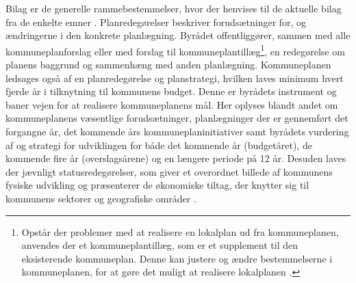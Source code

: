 \newline \indent{     }  Bilag er de generelle rammebestemmelser, hvor der henvises til de aktuelle bilag fra de enkelte emner \citep{bilag}.
\newline \indent{     }  Planredegørelser beskriver forudsætninger for, og ændringerne i den konkrete planlægning. Byrådet offentliggører, sammen med alle kommuneplanforslag eller med forslag til kommuneplantillæg\footnote{Opstår der problemer med at realisere en lokalplan ud fra kommuneplanen, anvendes der et kommuneplantillæg, som er et supplement til den eksisterende kommuneplan. Denne kan justere og ændre bestemmelserne i kommuneplanen, for at gøre det muligt at realisere lokalplanen \citep{kommuneplan2009}.}, en redegørelse om planens baggrund og sammenhæng med anden planlægning. Kommuneplanen ledsages også af en planredegørelse og planstrategi, hvilken laves minimum hvert fjerde år i tilknytning til kommunens budget. Denne er byrådets instrument og baner vejen for at realisere kommuneplanens mål. Her oplyses blandt andet om kommuneplanens væsentlige forudsætninger, planlægninger der er gennemført det forgangne år, det kommende års kommuneplaninitiativer samt byrådets vurdering af og strategi for udviklingen for både det kommende år (budgetåret), de kommende fire år (overslagsårene) og en længere periode på 12 år. Desuden laves der jævnligt statusredegørelser, som giver et overordnet billede af kommunens fysiske udvikling og præsenterer de økonomiske tiltag, der knytter sig til kommunens sektorer og geografiske områder \citep{planredegorelse}.

